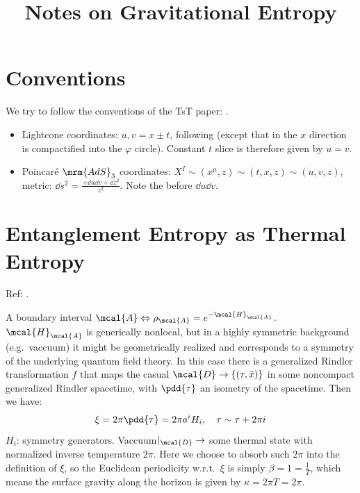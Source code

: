 \documentclass[a4paper
	,10pt
]{article}
\title{Notes on Gravitational Entropy}
\begin{document}
\maketitle
{}
\thispagestyle{empty}


\setlength{\parskip}{.1\baselineskip}
\tableofcontents
\setlength{\parskip}{\parskipnorm}

\addtocounter{section}{-1}
\section{Conventions}
	We try to follow the conventions of the TsT paper: \textcite{Apolo:2019zai}. 
	\begin{itemize}
	\item Lightcone coordinates: $u,v = x\pm t$, following \cite{Apolo:2019zai} (except that in \cite{Apolo:2019zai} the $x$ direction is compactified into the $\varphi$ circle). Constant $t$ slice is therefore given by $u = v$.
	
	\item Poincar\'e $\mrm{AdS}_3$ coordinates: $
			X^I \sim (x^\mu,z) \sim (t,x,z) \sim (u,v,z)
		$, metric: $
			\dd{s}^2 = \frac{+\dd{u} \dd{v} + \dd{z}^2}{z^2}
		$. Note the \mquote{+} before $\dd{u} \dd{v}$. 
	\end{itemize}
\section{Entanglement Entropy as Thermal Entropy}
	Ref: \textcite{Apolo:2020qjm}.
	
	A boundary interval $\mcal{A} \Leftrightarrow \rho_\mcal{A} = e^{-\mcal{H}_\mcal{A}}$. $\mcal{H}_\mcal{A}$ is generically nonlocal, but in a highly symmetric background (e.g.~vaccuum) it might be geometrically realized and corresponds to a symmetry of the underlying quantum field theory.
	In this case there is a generalized Rindler transformation $f$ that maps the casual $\mcal{D} \to \{(\tau,\tilde{x})\}$ in some noncompact generalized Rindler spacetime, with $\pdd{\tau}$ an isometry of the spacetime. Then we have:
	\begin{equation}
		\xi = 2\pi \pdd{\tau}
		= 2\pi a^i H_i,
	\quad
		\tau \sim \tau + 2\pi i
	\end{equation}
	$H_i$: symmetry generators. Vaccuum$|_\mcal{D}\to$ some thermal state with normalized inverse temperature $2\pi$. Here we choose to absorb such $2\pi$ into the definition of $\xi$, so the Euclidean periodicity w.r.t.~$\xi$ is simply $\beta = 1 = \frac{1}{T}$, which means the surface gravity along the horizon is given by $\kappa = 2\pi T = 2\pi$. 
\end{document}
